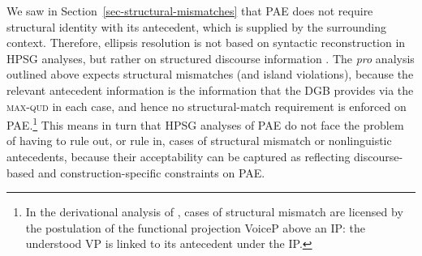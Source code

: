 We saw in Section~\ref{sec-structural-mismatches} that PAE does not require structural identity with its antecedent, which is supplied by the surrounding context. Therefore, ellipsis resolution is not based on syntactic reconstruction in HPSG analyses, but rather on structured discourse information \citep[see][295]{Ginzburg:Sag:2000}. %
%
The \emph{pro} analysis outlined above expects structural mismatches (and island violations), %
%
because the relevant antecedent information is the information that the DGB provides via the \textsc{max-qud} in each case, and hence no structural-match requirement is enforced on PAE.\footnote{In the derivational
analysis of \citet{Merchant2013}, cases of structural mismatch are licensed by
the postulation of the functional projection VoiceP above an IP: the understood
VP is linked to its antecedent under the IP.} This means in turn that HPSG analyses of PAE do not face the problem of having to rule out, or rule in, cases of structural mismatch or nonlinguistic antecedents, because their acceptability can be captured as reflecting discourse-based and construction-specific constraints on PAE.



